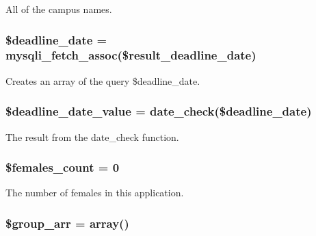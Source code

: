 \-All of the campus names. \hypertarget{admin__view_2index_8php_af9a17edb1f4ed37105db8233956d2287}{
\subsubsection[{\$deadline\-\_\-date}]{\setlength{\rightskip}{0pt plus 5cm}\$deadline\-\_\-date = mysqli\-\_\-fetch\-\_\-assoc(\$result\-\_\-deadline\-\_\-date)}}\label{admin__view_2index_8php_af9a17edb1f4ed37105db8233956d2287}
\-Creates an array of the query \$deadline\-\_\-date. \hypertarget{admin__view_2index_8php_a9eafe46b4e882510eb832a19390b28d5}{
\subsubsection[{\$deadline\-\_\-date\-\_\-value}]{\setlength{\rightskip}{0pt plus 5cm}\$deadline\-\_\-date\-\_\-value = {\bf date\-\_\-check}(\$deadline\-\_\-date)}}\label{admin__view_2index_8php_a9eafe46b4e882510eb832a19390b28d5}
\-The result from the date\-\_\-check function. \hypertarget{admin__view_2index_8php_a6b8782dbe4c91ae2ca45031af651d818}{
\subsubsection[{\$females\-\_\-count}]{\setlength{\rightskip}{0pt plus 5cm}\$females\-\_\-count = 0}}\label{admin__view_2index_8php_a6b8782dbe4c91ae2ca45031af651d818}
\-The number of females in this application. \hypertarget{admin__view_2index_8php_aacdcd61fee4523e3e12b143603e10590}{
\subsubsection[{\$group\-\_\-arr}]{\setlength{\rightskip}{0pt plus 5cm}\$group\-\_\-arr = array()}}\label{admin__view_2index_8php_aacdcd61fee4523e3e12b143603e10590}
